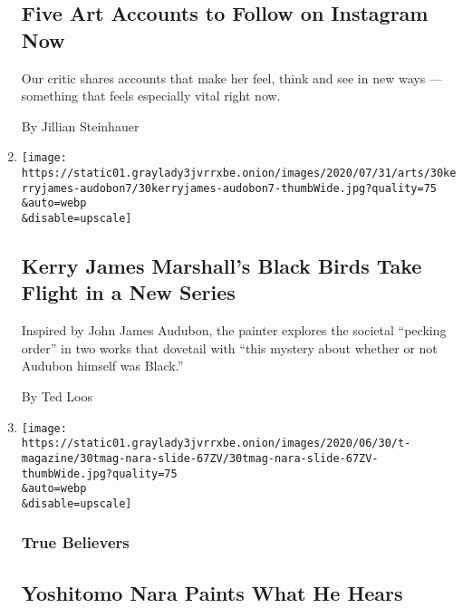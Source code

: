 \begin{enumerate}
  \hypertarget{five-art-accounts-to-follow-on-instagram-now}{%
  \subsection{Five Art Accounts to Follow on Instagram
  Now}\label{five-art-accounts-to-follow-on-instagram-now}}

  Our critic shares accounts that make her feel, think and see in new
  ways --- something that feels especially vital right now.

  By Jillian Steinhauer
\item
  \href{/2020/07/29/arts/design/kerry-james-marshall-audubon.html}{}

  \texttt{[image: https://static01.graylady3jvrrxbe.onion/images/2020/07/31/arts/30kerryjames-audobon7/30kerryjames-audobon7-thumbWide.jpg?quality=75\\\&auto=webp\\\&disable=upscale]}

  \hypertarget{kerry-james-marshalls-black-birds-take-flight-in-a-new-series}{%
  \subsection{Kerry James Marshall's Black Birds Take Flight in a New
  Series}\label{kerry-james-marshalls-black-birds-take-flight-in-a-new-series}}

  Inspired by John James Audubon, the painter explores the societal
  ``pecking order'' in two works that dovetail with ``this mystery about
  whether or not Audubon himself was Black.''

  By Ted Loos
\item
  \href{/2020/07/24/t-magazine/yoshitomo-nara.html}{}

  \texttt{[image: https://static01.graylady3jvrrxbe.onion/images/2020/06/30/t-magazine/30tmag-nara-slide-67ZV/30tmag-nara-slide-67ZV-thumbWide.jpg?quality=75\\\&auto=webp\\\&disable=upscale]}

  \hypertarget{true-believers}{%
  \subsubsection{True Believers}\label{true-believers}}

  \hypertarget{yoshitomo-nara-paints-what-he-hears}{%
  \subsection{Yoshitomo Nara Paints What He
  Hears}\label{yoshitomo-nara-paints-what-he-hears}}


\end{enumerate}

